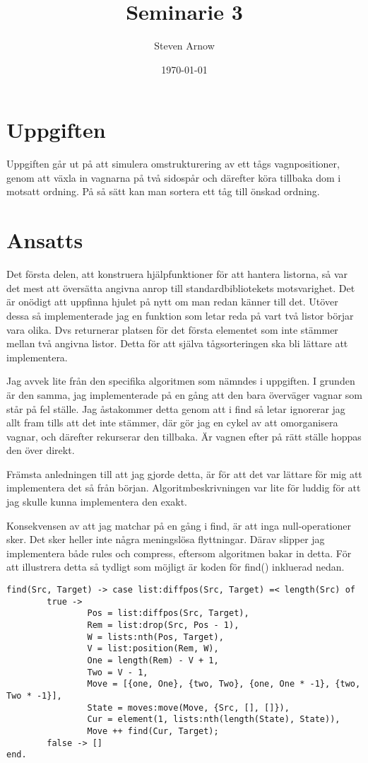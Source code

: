 \documentclass[a4paper, 11pt]{article}
\title{Seminarie 3}
\author{Steven Arnow}
\date{\today}
\begin{document}
\maketitle 

\section{Uppgiften}

Uppgiften går ut på att simulera omstrukturering av ett tågs vagnpositioner, genom att växla in vagnarna på två sidospår och därefter köra tillbaka dom i motsatt ordning. På så sätt kan man sortera ett tåg till önskad ordning.

\section{Ansatts}

Det första delen, att konstruera hjälpfunktioner för att hantera listorna, så var det mest att översätta angivna anrop till standardbibliotekets motsvarighet. Det är onödigt att uppfinna hjulet på nytt om man redan känner till det. Utöver dessa så implementerade jag en funktion som letar reda på vart två listor börjar vara olika. Dvs returnerar platsen för det första elementet som inte stämmer mellan två angivna listor. Detta för att själva tågsorteringen ska bli lättare att implementera.

Jag avvek lite från den specifika algoritmen som nämndes i uppgiften. I grunden är den samma, jag implementerade på en gång att den bara överväger vagnar som står på fel ställe. Jag åstakommer detta genom att i find så letar ignorerar jag allt fram tills att det inte stämmer, där gör jag en cykel av att omorganisera vagnar, och därefter rekurserar den tillbaka. Är vagnen efter på rätt ställe hoppas den över direkt.

Främsta anledningen till att jag gjorde detta, är för att det var lättare för mig att implementera det så från början. Algoritmbeskrivningen var lite för luddig för att jag skulle kunna implementera den exakt.

Konsekvensen av att jag matchar på en gång i find, är att inga null-operationer sker. Det sker heller inte några meningslösa flyttningar. Därav slipper jag implementera både rules och compress, eftersom algoritmen bakar in detta. För att illustrera detta så tydligt som möjligt är koden för find() inkluerad nedan.
\pagebreak

\begin{verbatim}
find(Src, Target) -> case list:diffpos(Src, Target) =< length(Src) of
        true ->
                Pos = list:diffpos(Src, Target),
                Rem = list:drop(Src, Pos - 1),
                W = lists:nth(Pos, Target),
                V = list:position(Rem, W),
                One = length(Rem) - V + 1,
                Two = V - 1,
                Move = [{one, One}, {two, Two}, {one, One * -1}, {two, Two * -1}],
                State = moves:move(Move, {Src, [], []}),
                Cur = element(1, lists:nth(length(State), State)),
                Move ++ find(Cur, Target);
        false -> []
end.
\end{verbatim}
\end{document}
